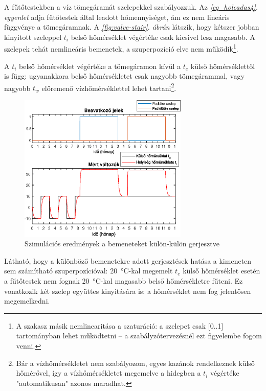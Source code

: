 A fűtőtestekben a víz tömegáramát szelepekkel szabályozzuk. Az \textit{\ref{eq_holeadas4}. egyenlet} adja fűtőtestek által leadott hőmennyiséget, ám ez nem lineáris függvénye a tömegáramnak. A \textit{\ref{fig:valve-stair}. ábrán} látszik, hogy kétszer jobban kinyitott szeleppel $t_i$ belső hőmérséklet végértéke csak kicsivel lesz magasabb. A szelepek tehát nemlineáris bemenetek, a szuperpozíció elve nem működik\footnote{A szakasz másik nemlinearitása a szaturáció: a szelepet csak [0..1] tartományban lehet működtetni -- a szabályzótervezésnél ezt figyelembe fogom venni.}.

A $t_i$ belső hőmérséklet végértéke a tömegáramon kívül a $t_e$ külső hőmérséklettől is függ: ugyanakkora belső hőmérsékletet csak nagyobb tömegárammal, vagy nagyobb $t_w$ előremenő vízhőmérséklettel lehet tartani\footnote{Bár a vízhőmérsékletet nem szabályozom, egyes kazánok rendelkeznek külső hőmérővel, így a vízhőmérsékletet megemelve a hidegben a $t_i$ végértéke "automatikusan" azonos maradhat.}. 

\begin{figure}[H]
	\centering
	\includegraphics[trim=0 0 0 0, clip,width=0.72\textwidth]{figures/valve-step-hot}
	\caption{Szimulációs eredmények a bemeneteket külön-külön gerjesztve}
	\label{fig:valve-step-hot}
\end{figure}

Látható, hogy a különböző bemenetekre adott gerjesztések hatása a kimeneten sem számítható szuperpozícióval: \SI{20}{\celsius}-kal megemelt $t_e$ külső hőmérséklet esetén a fűtőtestek nem fognak \SI{20}{\celsius}-kal magasabb belső hőmérsékletre fűteni. Ez vonatkozik két szelep együttes kinyitására is: a hőmérséklet nem fog jelentősen megemelkedni.

